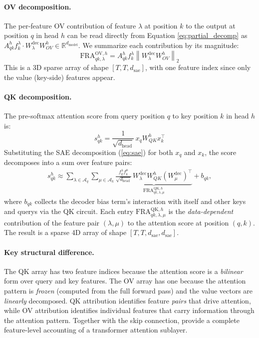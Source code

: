 \documentclass{article}
\theoremstyle{plain}
\theoremstyle{definition}
\theoremstyle{remark}
\newcommand{\WOV}{W_{OV}}
\newcommand{\WQK}{W_{QK}}
\newcommand{\dhead}{d_{\mathrm{head}}}
\newcommand{\dsae}{d_{\mathrm{sae}}}
\newcommand{\RR}{\mathbb{R}}
\begin{document}
\paragraph{OV decomposition.} The per-feature OV contribution of feature $\lambda$ at position $k$ to the output at position $q$ in head $h$ can be read directly from Equation \eqref{eq:partial_decomp} as $A^h_{qk} f_k^\lambda \cdot W^{\mathrm{dec}}_\lambda \WOV^h\in\RR^{d_\text{model}}$. We summarize each contribution by its magnitude:
\begin{equation}
    \mathrm{FRA}^{\mathrm{OV},h}_{qk,\lambda} = A^h_{qk} f_k^\lambda \left\lVert W^{\mathrm{dec}}_\lambda \WOV^h \right\rVert_2
    \label{eq:ov_fra}
\end{equation}
This is a 3D sparse array of shape $[T, T, \dsae]$, with one feature index since only the value (key-side) features appear.

\paragraph{QK decomposition.} The pre-softmax attention score from query position $q$ to key position $k$ in head $h$ is:
\begin{equation}
    s^h_{qk} = \frac{1}{\sqrt{\dhead}}\, x_q \WQK^h x_k^\top
    \label{eq:attn_score}
\end{equation}
Substituting the SAE decomposition (\eqref{eq:sae}) for both $x_q$ and $x_k$, the score decomposes into a sum over feature pairs:
\begin{equation}
\begin{aligned}
        s^h_{qk} \approx \sum_{\lambda \in \mathcal{A}_q} \sum_{\mu \in \mathcal{A}_k} \underbrace{\frac{f_q^\lambda f_k^\mu}{\sqrt{\dhead}}\, W^{\mathrm{dec}}_\lambda \WQK^h (W^{\mathrm{dec}}_\mu)^\top}_{\mathrm{FRA}^{\mathrm{QK},h}_{qk,\lambda,\mu}} + b_{qk},
\end{aligned}
    \label{eq:qk_fra}
\end{equation}
where $b_{qk}$ collects the decoder bias term's interaction with itself and other keys and querys via the QK circuit. Each entry $\mathrm{FRA}^{\mathrm{QK},h}_{qk,\lambda,\mu}$ is the \emph{data-dependent} contribution of the feature pair $(\lambda, \mu)$ to the attention score at position $(q,k)$. The result is a sparse 4D array of shape $[T, T, \dsae, \dsae]$.

\paragraph{Key structural difference.} The QK array has two feature indices because the attention score is a \emph{bilinear} form over query and key features. The OV array has one because the attention pattern is \emph{frozen} (computed from the full forward pass) and the value vectors are \emph{linearly} decomposed. QK attribution identifies feature \emph{pairs} that drive attention, while OV attribution identifies individual features that carry information through the attention pattern. Together with the skip connection,  provide a complete feature-level accounting of a transformer attention sublayer.
\end{document}

